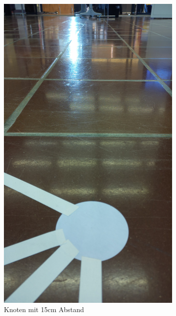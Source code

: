 \begin{figure}[H]
\centering
\begin{subfigure}{0.45\textwidth}
\centering
\includegraphics[width=0.95\linewidth]{assets/informatik-prototyp/opencv/angle_detection/image_taken_by_pi_camer_before_node.jpg} 
\caption{Knoten mit 15cm Abstand}
\label{fig:node-15cm-before}
\end{subfigure}
\begin{subfigure}{0.45\textwidth}
\centering

\end{subfigure}
\end{figure}
